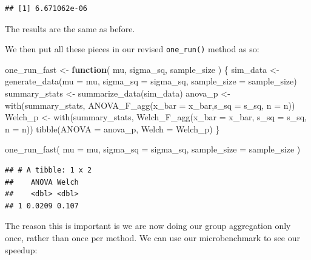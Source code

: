 \documentclass[
]{book}
\newenvironment{Shaded}{\begin{snugshade}}{\end{snugshade}}
\newcommand{\AttributeTok}[1]{\textcolor[rgb]{0.77,0.63,0.00}{#1}}
\newcommand{\ControlFlowTok}[1]{\textcolor[rgb]{0.13,0.29,0.53}{\textbf{#1}}}
\newcommand{\FunctionTok}[1]{\textcolor[rgb]{0.00,0.00,0.00}{#1}}
\newcommand{\NormalTok}[1]{#1}
\newcommand{\OtherTok}[1]{\textcolor[rgb]{0.56,0.35,0.01}{#1}}
\begin{document}
\begin{verbatim}
## [1] 6.671062e-06
\end{verbatim}

The results are the same as before.

We then put all these pieces in our revised \texttt{one\_run()} method as so:

\begin{Shaded}
\begin{Highlighting}[]
\NormalTok{one\_run\_fast }\OtherTok{\textless{}{-}} \ControlFlowTok{function}\NormalTok{( mu, sigma\_sq, sample\_size ) \{}
\NormalTok{  sim\_data }\OtherTok{\textless{}{-}} \FunctionTok{generate\_data}\NormalTok{(}\AttributeTok{mu =}\NormalTok{ mu, }\AttributeTok{sigma\_sq =}\NormalTok{ sigma\_sq,}
                            \AttributeTok{sample\_size =}\NormalTok{ sample\_size)}
\NormalTok{  summary\_stats }\OtherTok{\textless{}{-}} \FunctionTok{summarize\_data}\NormalTok{(sim\_data)}
\NormalTok{  anova\_p }\OtherTok{\textless{}{-}} \FunctionTok{with}\NormalTok{(summary\_stats, }
                  \FunctionTok{ANOVA\_F\_agg}\NormalTok{(}\AttributeTok{x\_bar =}\NormalTok{ x\_bar,}\AttributeTok{s\_sq =}\NormalTok{ s\_sq, }\AttributeTok{n =}\NormalTok{ n))}
\NormalTok{  Welch\_p }\OtherTok{\textless{}{-}} \FunctionTok{with}\NormalTok{(summary\_stats, }
                  \FunctionTok{Welch\_F\_agg}\NormalTok{(}\AttributeTok{x\_bar =}\NormalTok{ x\_bar, }\AttributeTok{s\_sq =}\NormalTok{ s\_sq, }\AttributeTok{n =}\NormalTok{ n))}
  \FunctionTok{tibble}\NormalTok{(}\AttributeTok{ANOVA =}\NormalTok{ anova\_p, }\AttributeTok{Welch =}\NormalTok{ Welch\_p)}
\NormalTok{\}}

\FunctionTok{one\_run\_fast}\NormalTok{( }\AttributeTok{mu =}\NormalTok{ mu, }\AttributeTok{sigma\_sq =}\NormalTok{ sigma\_sq,}
              \AttributeTok{sample\_size =}\NormalTok{ sample\_size )}
\end{Highlighting}
\end{Shaded}

\begin{verbatim}
## # A tibble: 1 x 2
##    ANOVA Welch
##    <dbl> <dbl>
## 1 0.0209 0.107
\end{verbatim}

The reason this is important is we are now doing our group aggregation only once, rather than once per method. We can use our microbenchmark to see our speedup:
\end{document}

